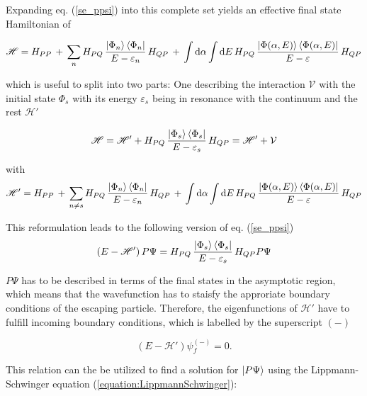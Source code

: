Expanding eq. (\ref{se_ppsi}) into this complete set yields an effective
final state Hamiltonian of

\begin{equation}
  \mathscr{H} = H_{PP}\, + \,
  \sum\limits_n H_{PQ} \,\frac{\ket{\Phi_n}\bra{\Phi_n}}{E-\varepsilon_n}\, H_{QP} \,+\,
  \int \mathrm{d}\alpha \int\mathrm{d}E \,H_{PQ} \,
  \frac{\ket{\Phi(\alpha,E)}\bra{\Phi(\alpha,E)}}{E-\varepsilon} \, H_{QP}
\end{equation}

which is useful to split into two parts: One describing the interaction
$\mathcal{V}$ with the
initial state $\Phi_s$ with its energy $\varepsilon_s$ being in resonance with
the continuum and the rest $\mathscr{H}'$

\begin{equation}
  \mathscr{H} = \mathscr{H}' +
                H_{PQ} \,\frac{\ket{\Phi_s}\bra{\Phi_s}}{E-\varepsilon_s}\, H_{QP}
              = \mathscr{H}' + \mathcal{V}
\end{equation}

with
\begin{equation}
  \mathscr{H}' = H_{PP}\, + \,
  \sum\limits_{n\ne s} H_{PQ} \,\frac{\ket{\Phi_n}\bra{\Phi_n}}{E-\varepsilon_n}
  \, H_{QP} \,+\,
  \int \mathrm{d}\alpha \int\mathrm{d}E \,H_{PQ} \,
  \frac{\ket{\Phi(\alpha,E)}\bra{\Phi(\alpha,E)}}{E-\varepsilon} \, H_{QP}
\end{equation}

This reformulation leads to the following version of eq. (\ref{se_ppsi})
\begin{equation}
  (E - \mathscr{H}')\, P \Psi =
   H_{PQ} \,\frac{\ket{\Phi_s}\bra{\Phi_s}}{E-\varepsilon_s}\, H_{QP} P \Psi %
\end{equation}

$P \Psi$ has to be described in terms of the final states in the asymptotic
region, which means that the wavefunction has to staisfy the approriate
boundary conditions of the escaping particle. Therefore,
the eigenfunctions of $\mathscr{H}'$ have to fulfill incoming boundary conditions,
which is labelled by the superscript $(-)$

\begin{equation}
  (E-\mathscr{H}') \psi_f^{(-)} = 0 \label{sol_outg} .
\end{equation}

This relation can the be utilized to find a solution for $\ket{P \Psi}$
using the Lippmann-Schwinger equation (\ref{equation:LippmannSchwinger}):

